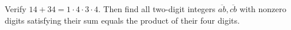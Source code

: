Verify $14+34=1\cdot4\cdot3\cdot4$. Then find all two-digit integers $\overline{ab},\overline{cb}$ with nonzero digits satisfying their sum equals the product of their four digits.
